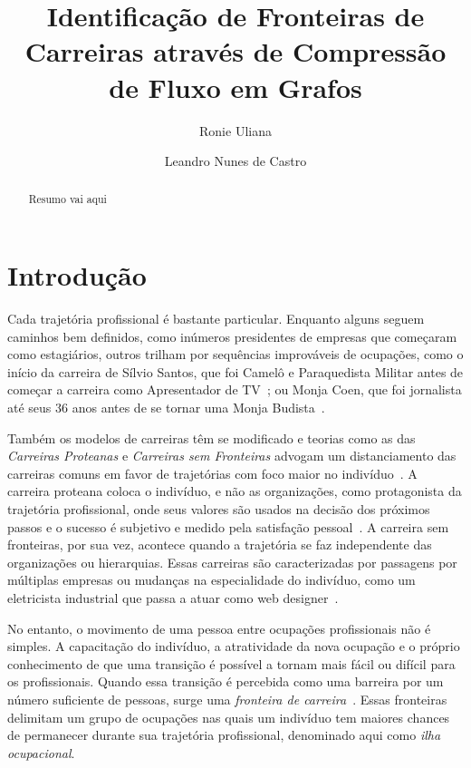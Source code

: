\documentclass[
  article,
  11pt,
  a4paper,
  english,
  brazil,
  sumario=tradicional]{abntex2}
\title{Identificação de Fronteiras de Carreiras através de Compressão de Fluxo em Grafos}
\author{Ronie Uliana \and Leandro Nunes de Castro}
\begin{document}

\frenchspacing

\maketitle

\begin{abstract}
Resumo vai aqui
\end{abstract}

\section{Introdução}

Cada trajetória profissional é bastante particular. Enquanto alguns seguem caminhos bem definidos, como inúmeros presidentes de empresas que começaram como estagiários, outros trilham por sequências improváveis de ocupações, como o início da carreira de Sílvio Santos, que foi Camelô e Paraquedista Militar antes de começar a carreira como Apresentador de TV~\cite{Morgado2017-mb}; ou Monja Coen, que foi jornalista até seus 36 anos antes de se tornar uma Monja Budista~\cite{Steiner2009-oy}.

Também os modelos de carreiras têm se modificado e teorias como as das \textit{Carreiras Proteanas} e \textit{Carreiras sem Fronteiras} advogam um distanciamento das carreiras comuns em favor de trajetórias com foco maior no indivíduo~\cite{Bendassolli2009-bg}. A carreira proteana coloca o indivíduo, e não as organizações, como protagonista da trajetória profissional, onde seus valores são usados na decisão dos próximos passos e o sucesso é subjetivo e medido pela satisfação pessoal~\cite{Hall2004-ke}. A carreira sem fronteiras, por sua vez, acontece quando a trajetória se faz independente das organizações ou hierarquias. Essas carreiras são caracterizadas por passagens por múltiplas empresas ou mudanças na especialidade do indivíduo, como um eletricista industrial que passa a atuar como web designer~\cite{Arthur1994-qq}.

No entanto, o movimento de uma pessoa entre ocupações profissionais não é simples. A capacitação do indivíduo, a atratividade da nova ocupação e o próprio conhecimento de que uma transição é possível a tornam mais fácil ou difícil para os profissionais. Quando essa transição é percebida como uma barreira por um número suficiente de pessoas, surge uma \textit{fronteira de carreira}~\cite{Gunz2007-hr}. Essas fronteiras delimitam um grupo de ocupações nas quais um indivíduo tem maiores chances de permanecer durante sua trajetória profissional, denominado aqui como \textit{ilha ocupacional}.
\end{document}
